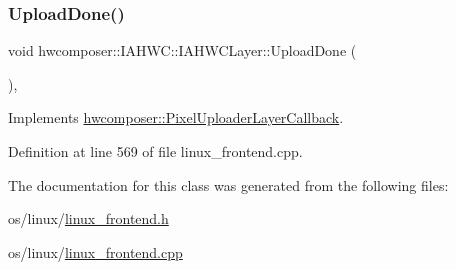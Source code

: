 \mbox{\label{classhwcomposer_1_1IAHWC_1_1IAHWCLayer_a70158d804e3bf021d32847ffaa33d98d}} 
\subsubsection{\texorpdfstring{Upload\+Done()}{UploadDone()}}
{\footnotesize\ttfamily void hwcomposer\+::\+I\+A\+H\+W\+C\+::\+I\+A\+H\+W\+C\+Layer\+::\+Upload\+Done (\begin{DoxyParamCaption}{ }\end{DoxyParamCaption})\hspace{0.3cm}{\ttfamily [override]}, {\ttfamily [virtual]}}



Implements \mbox{\hyperlink{classhwcomposer_1_1PixelUploaderLayerCallback_a3234bfd4e803b50e8f41cb53ff430559}{hwcomposer\+::\+Pixel\+Uploader\+Layer\+Callback}}.



Definition at line 569 of file linux\+\_\+frontend.\+cpp.


\begin{DoxyCode}{0}
\end{DoxyCode}


The documentation for this class was generated from the following files\+:\begin{DoxyCompactItemize}
\item 
os/linux/\mbox{\hyperlink{linux__frontend_8h}{linux\+\_\+frontend.\+h}}\item 
os/linux/\mbox{\hyperlink{linux__frontend_8cpp}{linux\+\_\+frontend.\+cpp}}\end{DoxyCompactItemize}
